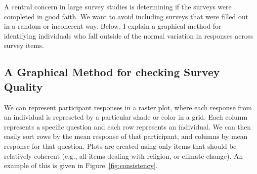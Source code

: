 A central concern in large survey studies is determining if the surveys were
completed in good faith. We want to avoid including surveys that were filled out
in a random or incoherent way. Below, I explain a graphical method for identifying individuals who fall outside
of the normal variation in responses across survey items.

\subsection{A Graphical Method for checking Survey Quality}

We can represent participant responses in a raster plot, where each response
from an individual is represeted by a particular shade or color in a grid. Each
column represents a specific question and each row represents an individual. We
can then easily sort rows by the mean response of that participant, and columns
by mean response for that question. Plots are created using only items that
should be relatively coherent (e.g., all items dealing with religion, or climate
change). An example of this is given in Figure~\ref{fig:consistency}.

